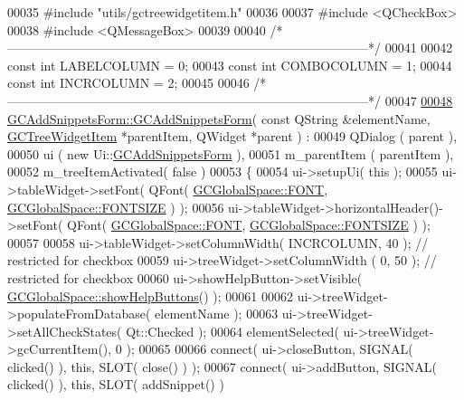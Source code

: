 \begin{DoxyCode}
00035 \textcolor{preprocessor}{#include "utils/gctreewidgetitem.h"}
00036 
00037 \textcolor{preprocessor}{#include <QCheckBox>}
00038 \textcolor{preprocessor}{#include <QMessageBox>}
00039 
00040 \textcolor{comment}{/*
      --------------------------------------------------------------------------------------*/}
00041 
00042 \textcolor{keyword}{const} \textcolor{keywordtype}{int} LABELCOLUMN = 0;
00043 \textcolor{keyword}{const} \textcolor{keywordtype}{int} COMBOCOLUMN = 1;
00044 \textcolor{keyword}{const} \textcolor{keywordtype}{int} INCRCOLUMN  = 2;
00045 
00046 \textcolor{comment}{/*
      --------------------------------------------------------------------------------------*/}
00047 
\hypertarget{gcaddsnippetsform_8cpp_source_l00048}{}\hyperlink{class_g_c_add_snippets_form_af1cfc60ffd8ac6b25f1d1a2dc49e311b}{00048} \hyperlink{class_g_c_add_snippets_form_af1cfc60ffd8ac6b25f1d1a2dc49e311b}{GCAddSnippetsForm::GCAddSnippetsForm}( \textcolor{keyword}{const} QString &elementName, 
      \hyperlink{class_g_c_tree_widget_item}{GCTreeWidgetItem} *parentItem, QWidget *parent ) :
00049   QDialog            ( parent ),
00050   ui                 ( new Ui::\hyperlink{class_g_c_add_snippets_form}{GCAddSnippetsForm} ),
00051   m\_parentItem       ( parentItem ),
00052   m\_treeItemActivated( false )
00053 \{
00054   ui->setupUi( \textcolor{keyword}{this} );
00055   ui->tableWidget->setFont( QFont( \hyperlink{namespace_g_c_global_space_a9d7158c8a1dfcc867d85ee6b9c5c4810}{GCGlobalSpace::FONT}, \hyperlink{namespace_g_c_global_space_ab9fa2f10bab070a4f59b7e3ef9166c86}{GCGlobalSpace::FONTSIZE}
       ) );
00056   ui->tableWidget->horizontalHeader()->setFont( QFont( \hyperlink{namespace_g_c_global_space_a9d7158c8a1dfcc867d85ee6b9c5c4810}{GCGlobalSpace::FONT}, 
      \hyperlink{namespace_g_c_global_space_ab9fa2f10bab070a4f59b7e3ef9166c86}{GCGlobalSpace::FONTSIZE} ) );
00057 
00058   ui->tableWidget->setColumnWidth( INCRCOLUMN, 40 );  \textcolor{comment}{// restricted for
       checkbox}
00059   ui->treeWidget->setColumnWidth ( 0, 50 );           \textcolor{comment}{// restricted for
       checkbox}
00060   ui->showHelpButton->setVisible( \hyperlink{namespace_g_c_global_space_a981753e55f0f77f981f67ccb1ad4ecf1}{GCGlobalSpace::showHelpButtons}() );
00061 
00062   ui->treeWidget->populateFromDatabase( elementName );
00063   ui->treeWidget->setAllCheckStates( Qt::Checked );
00064   elementSelected( ui->treeWidget->gcCurrentItem(), 0 );
00065 
00066   connect( ui->closeButton,    SIGNAL( clicked() ), \textcolor{keyword}{this}, SLOT( close() ) );
00067   connect( ui->addButton,      SIGNAL( clicked() ), \textcolor{keyword}{this}, SLOT( addSnippet() ) 

\end{DoxyCode}
